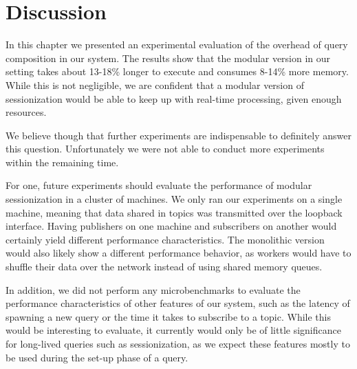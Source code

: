 \clearpage
\section{Discussion}

In this chapter we presented an experimental evaluation of the overhead of
query composition in our system. The results show that the modular version in
our setting takes about 13-18\% longer to execute and consumes 8-14\% more
memory. While this is not negligible, we are confident that a modular version
of sessionization would be able to keep up with real-time processing, given
enough resources.

We believe though that further experiments are indispensable to definitely 
answer this question. Unfortunately we were not able to conduct more experiments
within the remaining time.

For one, future experiments should evaluate the performance of modular sessionization
in a cluster of machines. We only ran our experiments on a single machine, meaning that
data shared in topics was transmitted over the loopback interface.
Having publishers on one machine and subscribers on another would certainly yield
different performance characteristics. The monolithic version would also
likely show a different performance behavior, as workers would have to shuffle their data over the
network instead of using shared memory queues.

In addition, we did not perform any microbenchmarks to evaluate the performance
characteristics of other features of our system, such as the latency
of spawning a new query or the time it takes to subscribe to a topic. While
this would be interesting to evaluate, it currently would only be of little
significance for long-lived queries such as sessionization, as we expect
these features mostly to be used during the set-up phase of a query.

